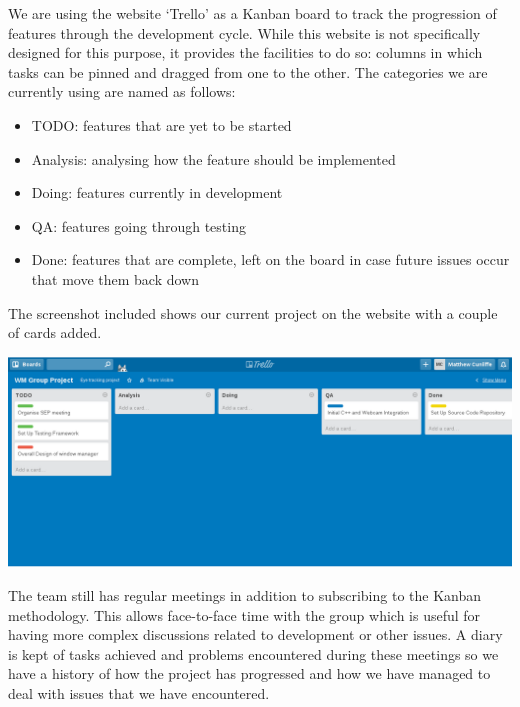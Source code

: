 \documentclass{article}
\begin{document}
\clearpage
We are using the website ‘Trello’ as a Kanban board to track the progression of features through the development cycle.  While this website is not specifically designed for this purpose, it provides the facilities to do so: columns in which tasks can be pinned and dragged from one to the other.  The categories we are currently using are named as follows:

\begin{itemize}
\item TODO: features that are yet to be started
\item Analysis: analysing how the feature should be implemented
\item Doing: features currently in development
\item QA: features going through testing
\item Done: features that are complete, left on the board in case future issues occur that move them back down
\end{itemize}

The screenshot included shows our current project on the website with a couple of cards added. \\[1mm]

{\centering
\includegraphics[scale=0.35]{trello.png}\par
}

\vspace*{2mm}
The team still has regular meetings in addition to subscribing to the Kanban methodology.  This allows face-to-face time with the group which is useful for having more complex discussions related to development or other issues.  A diary is kept of tasks achieved and problems encountered during these meetings so we have a history of how the project has progressed and how we have managed to deal with issues that we have encountered.
\end{document}
